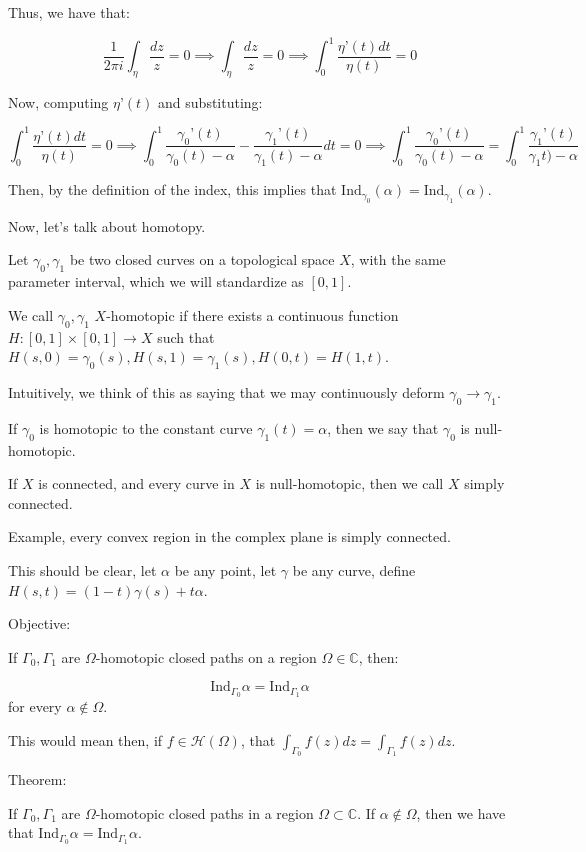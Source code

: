 \documentclass[10pt]{article}
\newcommand{\calH}{\mathcal{H}}
\newcommand{\ind}{\text{Ind}}
\begin{document}
Thus, we have that:

$$ \frac{1}{2\pi i} \int_{\eta} \frac{dz}{z} = 0 \implies  \int_{\eta} \frac{dz}{z} = 0 \implies \int_{0}^1 \frac{\eta’(t) dt}{\eta(t)} = 0$$

Now, computing $\eta’(t)$ and substituting:

$$  \int_{0}^1 \frac{\eta’(t) dt}{\eta(t)} = 0 \implies  \int_{0}^1 \frac{\gamma_0’(t)}{\gamma_0(t) - \alpha } - \frac{\gamma_1’(t)}{\gamma_1(t) - \alpha } dt = 0 \implies \int_0^1 \frac{\gamma_0’(t)}{\gamma_0(t) - \alpha }  =\int_0^1 \frac{\gamma_1’(t)}{\gamma_1t) - \alpha }  $$ 

Then, by the definition of the index, this implies that $\ind_{\gamma_0}(\alpha) = \ind_{\gamma_1}(\alpha)$.

Now, let’s talk about homotopy.

Let $\gamma_0, \gamma_1$ be two closed curves on a topological space $X$, with the same parameter interval, which we will standardize as $[0,1]$.

We call $\gamma_0, \gamma_1$ $X$-homotopic if there exists a continuous function $H: [0,1] \times [0,1] \to X$ such that $H(s,0) = \gamma_0(s), H(s,1) = \gamma_1(s), H(0,t) = H(1,t)$. 

Intuitively, we think of this as saying that we may continuously deform $\gamma_0 \to \gamma_1$.

If $\gamma_0$ is homotopic to the constant curve $\gamma_1(t) = \alpha$, then we say that $\gamma_0$ is null-homotopic.

If $X$ is connected, and every curve in $X$ is null-homotopic, then we call $X$ simply connected.

Example, every convex region in the complex plane is simply connected.

This should be clear, let $\alpha$ be any point, let $\gamma$ be any curve, define $H(s,t) = (1 - t) \gamma(s) + t \alpha$.

Objective:

If $\Gamma_0, \Gamma_1$ are $\Omega$-homotopic closed paths on a region $\Omega \in \mathbb{C}$, then:

$$\ind_{\Gamma_0} \alpha = \ind_{\Gamma_1} \alpha$$ for every $\alpha \not \in \Omega$.

This would mean then, if $f \in \calH(\Omega)$, that $\int_{\Gamma_0} f(z) dz = \int_{\Gamma_1} f(z)dz $.

Theorem:

If $\Gamma_0, \Gamma_1$ are $\Omega$-homotopic closed paths in a region $\Omega \subset \mathbb{C}$. If $\alpha \not \in \Omega$, then we have that $\ind_{\Gamma_0} \alpha = \ind_{\Gamma_1} \alpha$.
\end{document}
